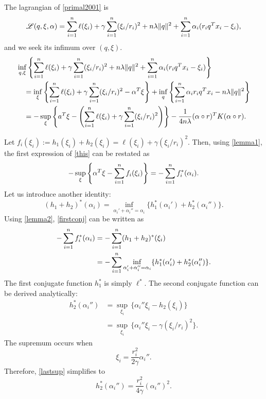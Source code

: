 The lagrangian of \eqref{primal2001} is
\begin{equation}
  \mathscr{L}(q,\xi,\alpha) = \sum_{i=1}^n \ell(\xi_i) + \gamma\sum_{i=1}^n(\xi_i/r_i)^2 + n\lambda\|q\|^2 + \sum_{i=1}^n \alpha_i(r_iq^Tx_i - \xi_i),
\end{equation}
and we seek its infimum over $(q,\xi)$.
\begin{align}
  &\inf_{q,\xi} \left\{\sum_{i=1}^n \ell(\xi_i) + \gamma\sum_{i=1}^n (\xi_i/r_i)^2 + n\lambda\|q\|^2 + \sum_{i=1}^n \alpha_i(r_iq^Tx_i -
    \xi_i)\right\}\\
  &\quad =\inf_\xi\left\{\sum_{i=1}^n \ell(\xi_i) + \gamma\sum_{i=1}^n(\xi_i/r_i)^2 - \alpha^T\xi\right\} + \inf_q\left\{\sum_{i=1}^n
    \alpha_ir_iq^Tx_i - n\lambda\|q\|^2\right\}\\
  &\quad = - \sup_\xi\left\{a^T\xi - \left(\sum_{i=1}^n \ell(\xi_i) + \gamma\sum_{i=1}^n(\xi_i/r_i)^2\right)\right\}
    - \frac{1}{4n\lambda} (\alpha \circ r)^TK(\alpha \circ r)\label{this}.
\end{align}

Let $f_i(\xi_i) := h_1(\xi_i)+ h_2(\xi_i) = \ell(\xi_i) + \gamma(\xi_i/r_i)^2$. Then, using \eqref{lemma1},
the first expression of \eqref{this} can be restated as
\begin{equation}
  \label{firstconj}
  -\sup_\xi\left\{\alpha^T \xi - \sum_{i=1}^n f_i(\xi_i)\right\} = -\sum_{i=1}^n f_i^*(\alpha_i).
\end{equation}
Let us introduce another identity:
\begin{equation}
  \label{lemma2}
  (h_1+h_2)^*(\alpha_i) = \inf_{\alpha_i'+\alpha_i''=\alpha_i} \{h_1^*(\alpha_i') + h_2^*(\alpha_i'')\}.
\end{equation}
Using \eqref{lemma2}, \eqref{firstconj} can be written as
\begin{align}
  -\sum_{i=1}^n f_i^*(\alpha_i) &= -\sum_{i=1}^n (h_1+h_2)^*(\xi_i)\\
                    &= -\sum_{i=1}^n \inf_{\alpha_i'+\alpha_i''=\alpha_i} \{h_1^*(\alpha_i') + h_2^*(\alpha_i'')\}.
\end{align}
The first conjugate function $h_1^*$ is simply $\ell^*$. The second conjugate function can be
derived analytically:
\begin{align}
  h_2^*(\alpha_i'') &= \sup_{\xi_i}\,\{\alpha_i''\xi_i - h_2(\xi_i)\}\\
               &= \sup_{\xi_i}\,\{\alpha_i''\xi_i - \gamma(\xi_i/r_i)^2\}\label{lastsup}.
\end{align}
The supremum occurs when
\begin{equation}
  \label{supconj}
  \xi_i = \frac{r_i^2}{2\gamma}\alpha_i''.
\end{equation}
Therefore, \eqref{lastsup} simplifies to
\begin{equation}
  h_2^*(\alpha_i'') = \frac{r_i^2}{4\gamma}(\alpha_i'')^2.
\end{equation}

